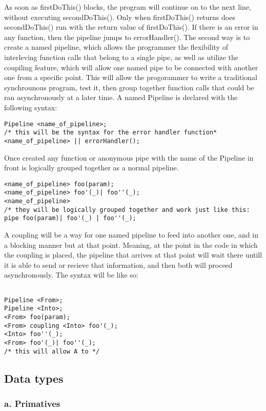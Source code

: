 \documentclass[11pt]{article}
\begin{document}
As soon as firstDoThis() blocks, the program will continue on to the next line, 
without executing secondDoThis(). Only when firstDoThis() returns does 
secondDoThis() run with the return value of firstDoThis(). If there is an 
error in any function, then the pipeline jumps to errorHandler().
The second way is to create a named pipeline, which allows the programmer the flexibility of interleving function calls that belong to a single pipe, as well as utilize the coupiling feature, which will allow one named pipe to be connected with another one from a specific point. This will allow the progorammer to write a traditional synchrounous program, test it, then group together function calls that could be ran asynchronously at a later time. A named Pipeline is declared with the following syntax:
\begin{lstlisting}
Pipeline <name_of_pipeline>;
/* this will be the syntax for the error handler function*
<name_of_pipeline> || errorHandler();
\end{lstlisting}
Once created any function or anonymous pipe with the name of the Pipeline in front is logically grouped together as a normal pipeline.
\begin{lstlisting}
<name_of_pipeline> foo(param);
<name_of_pipeline> foo'(_)| foo''(_);
<name_of_pipeline>
/* they will be logically grouped together and work just like this:
pipe foo(param)| foo'(_) | foo''(_);
\end{lstlisting}

A coupling will be a way for one named pipeline to feed into another one, and in a blocking manner but at that point. Meaning, at the point in the code in which the coupling is placed, the pipeline that arrives at that point will wait there untill it is able to send or recieve that information, and then both will proceed asynchronously. The syntax will be like so:
\begin{lstlisting}

Pipeline <From>;
Pipeline <Into>;
<From> foo(param);
<From> coupling <Into> foo'(_);
<Into> foo''(_);
<From> foo'(_)| foo''(_);
/* this will allow A to */
\end{lstlisting}
\subsection*{Data types}

\subsubsection*{a. Primatives}
\end{document}
